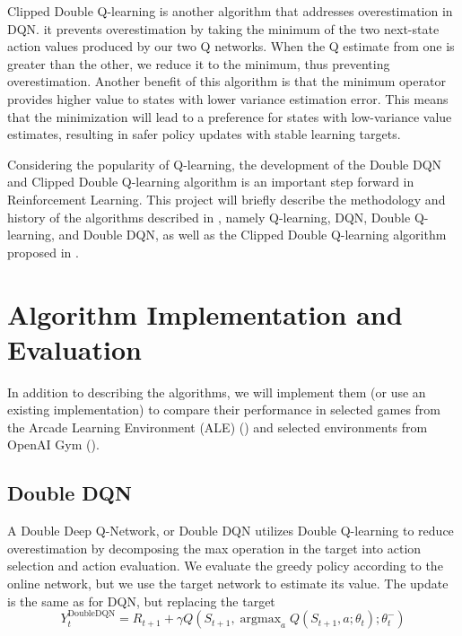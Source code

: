 \documentclass{article}
\DeclareMathOperator*{\argmax}{argmax}
\begin{document}
Clipped Double Q-learning is another algorithm that addresses overestimation in
DQN. it prevents overestimation by taking the minimum of the two next-state
action values produced by our two Q networks.  When the Q estimate from one is
greater than the other, we reduce it to the minimum, thus preventing
overestimation.  Another benefit of this algorithm is that the minimum operator
provides higher value to states with lower variance estimation error.  This
means that the minimization will lead to a preference for states with
low-variance value estimates, resulting in safer policy updates with stable
learning targets.



Considering the popularity of Q-learning, the development of the Double DQN and
Clipped Double Q-learning algorithm is an important step forward in
Reinforcement Learning. This project will briefly describe the methodology and
history of the algorithms described in \citet{van2016deep}, namely Q-learning,
DQN, Double Q-learning, and Double DQN, as well as the Clipped Double Q-learning
algorithm proposed in \citet{fujimoto2018addressing}. 


\section{Algorithm Implementation and Evaluation}

In addition to describing the algorithms, we will implement them (or use an
existing implementation) to compare their performance in selected games from the
Arcade Learning Environment (ALE) (\citet{bellemare2013arcade}) and selected
environments from OpenAI Gym (\citet{brockman2016openai}).

\subsection{Double DQN}
A Double Deep Q-Network, or Double DQN utilizes Double Q-learning to reduce
overestimation by decomposing the max operation in the target into action
selection and action evaluation. We evaluate the greedy policy according to the
online network, but we use the target network to estimate its value. The update
is the same as for DQN, but replacing the target
\[
    Y_{t}^{\text{DoubleDQN}} = R_{t+1} + \gamma Q(S_{t+1}, \argmax_a Q(S_{t+1},
    a; \theta _{t});\theta _{t}^{-})
\]
\end{document}
